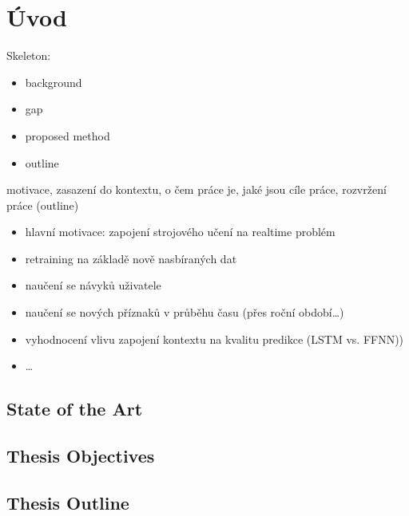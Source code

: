 \chapter{Úvod} \label{chap:introduction}

Skeleton:
\begin{itemize}
    \item background
    \item gap
    \item proposed method
    \item outline
\end{itemize}

motivace, zasazení do kontextu, o čem práce je, jaké jsou cíle práce, rozvržení práce (outline)
\begin{itemize}
    \item hlavní motivace: zapojení strojového učení na realtime problém
    \item retraining na základě nově nasbíraných dat
    \item naučení se návyků uživatele
    \item naučení se nových příznaků v průběhu času (přes roční období…)
    \item vyhodnocení vlivu zapojení kontextu na kvalitu predikce (LSTM vs. FFNN))
    \item …
\end{itemize}


\section{State of the Art} \label{sec:state_of_the_art}

\section{Thesis Objectives} \label{sec:thesis_objectives}

\section{Thesis Outline} \label{sec:thesis_outline}
